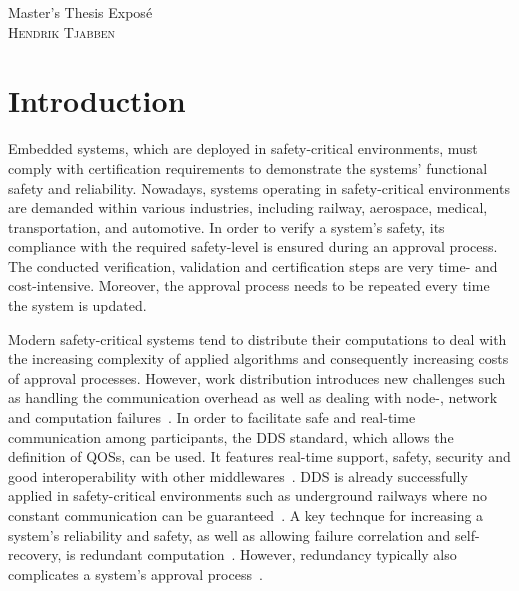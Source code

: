 \documentclass[a4paper, 12pt]{scrartcl}
\begin{document}
\begin{center}
  \Huge{Master's Thesis Expos\'{e}}\\
  \large{\textsc{Hendrik Tjabben}}
\end{center}


\section*{Introduction}
Embedded systems, which are deployed in safety-critical environments, must comply with certification requirements to demonstrate the systems' functional safety and reliability.
Nowadays, systems operating in safety-critical environments are demanded within various industries, including railway, aerospace, medical, transportation, and automotive.
In order to verify a system's safety, its compliance with the required safety-level is ensured during an approval process.
The conducted verification, validation and certification steps are very time- and cost-intensive.
Moreover, the approval process needs to be repeated every time the system is updated.

Modern safety-critical systems tend to distribute their computations to deal with the increasing complexity of applied algorithms and consequently increasing costs of approval processes.
However, work distribution introduces new challenges such as handling the communication overhead as well as dealing with node-, network and computation failures~\cite{DistributedSafety2020}.
In order to facilitate safe and real-time communication among participants, the \ac{DDS} standard, which allows the definition of \acp{QOS}, can be used.
It features real-time support, safety, security and good interoperability with other middlewares~\cite{DistributedSafety2020}.
\ac{DDS} is already successfully applied in safety-critical environments such as underground railways where no constant communication can be guaranteed~\cite{DDSInURail}.
A key technque for increasing a system's reliability and safety, as well as allowing failure correlation and self-recovery, is redundant computation~\cite{TanenbaumSteen07}.
However, redundancy typically also complicates a system's approval process~\cite{ReliabilityThroughRedundancy}.

\end{document}
